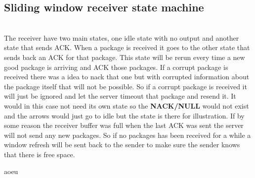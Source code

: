 \documentclass[conference]{IEEEtran}
\begin{document}
\subsection{Sliding window receiver state machine}

\\The receiver have two main states, one idle state with no output and another state that sends ACK. When a package is received it goes to the other state that sends back an ACK for that package. This state will be rerun every time a new good package is arriving and ACK those packages. If a corrupt package is received there was a idea to nack that one but with corrupted information about the package itself that will not be possible. So if a corrupt package is received it will just be ignored and let the server timeout that package and resend it. It would in this case not need its own state so the \textbf{NACK/NULL} would not exist and the arrows would just go to idle but the state is there for illustration. If by some reason the receiver buffer was full when the last ACK was sent the server will not send any new packages. So if no packages has been received for a while a window refresh will be sent back to the sender to make sure the sender knows that there is free space. 


aoeu
\end{document}
